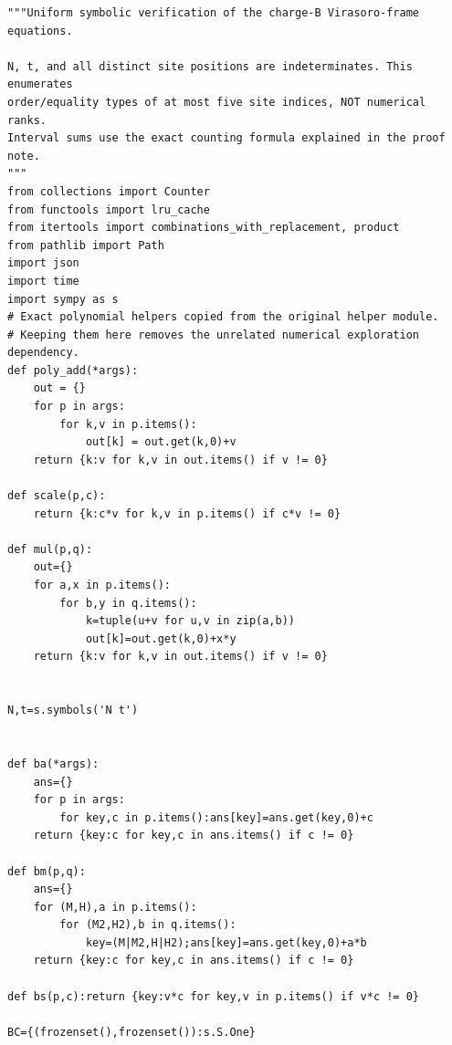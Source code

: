 \documentclass[11pt,a4paper]{article}
\numberwithin{equation}{section}
\theoremstyle{definition}\newtheorem{definition}[theorem]{Definition}
\theoremstyle{remark}\newtheorem{remark}[theorem]{Remark}
\begin{document}
\begin{lstlisting}
"""Uniform symbolic verification of the charge-B Virasoro-frame equations.

N, t, and all distinct site positions are indeterminates. This enumerates
order/equality types of at most five site indices, NOT numerical ranks.
Interval sums use the exact counting formula explained in the proof note.
"""
from collections import Counter
from functools import lru_cache
from itertools import combinations_with_replacement, product
from pathlib import Path
import json
import time
import sympy as s
# Exact polynomial helpers copied from the original helper module.
# Keeping them here removes the unrelated numerical exploration dependency.
def poly_add(*args):
    out = {}
    for p in args:
        for k,v in p.items():
            out[k] = out.get(k,0)+v
    return {k:v for k,v in out.items() if v != 0}

def scale(p,c):
    return {k:c*v for k,v in p.items() if c*v != 0}

def mul(p,q):
    out={}
    for a,x in p.items():
        for b,y in q.items():
            k=tuple(u+v for u,v in zip(a,b))
            out[k]=out.get(k,0)+x*y
    return {k:v for k,v in out.items() if v != 0}


N,t=s.symbols('N t')


def ba(*args):
    ans={}
    for p in args:
        for key,c in p.items():ans[key]=ans.get(key,0)+c
    return {key:c for key,c in ans.items() if c != 0}

def bm(p,q):
    ans={}
    for (M,H),a in p.items():
        for (M2,H2),b in q.items():
            key=(M|M2,H|H2);ans[key]=ans.get(key,0)+a*b
    return {key:c for key,c in ans.items() if c != 0}

def bs(p,c):return {key:v*c for key,v in p.items() if v*c != 0}

BC={(frozenset(),frozenset()):s.S.One}



\end{lstlisting}
\end{document}
